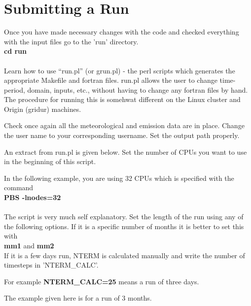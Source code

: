 \chapter{Submitting a Run}

Once you have made necessary changes with the code and checked
everything with the input files go to the 'run' directory. \\

\textbf{cd run} \\
\\


Learn how to use ``run.pl'' (or grun.pl) - the perl scripts which generates
the appropriate Makefile and fortran files. run.pl allows
the user to change time-period, domain, inputs, etc., without
having to change any fortran files by hand. The procedure for running
this is somehwat different on the Linux cluster and  Origin (gridur)
machines.

Check once again all the meteorological and emission data are in place.  Change
the user name to your corresponding username.  Set the output path
properly. 


An extract from run.pl  is given below.  Set the number of CPUs you
want to use in the beginning of this script. 


In the following example, you are using 32 CPUs which is specified
with the command \\

\textbf{PBS -lnodes=32} \\
\\

The script is very much self explanatory.  Set the length of the run
using any of the following options.  If it is a specific number of months it
is better to set this with \\

\textbf{mm1} and \textbf{mm2}\\


If it is a few days run, NTERM is calculated manually and write the
number of timesteps in 'NTERM\_CALC'.  

For example \textbf{NTERM\_CALC=25} means a run of three days. 

 The example given here is for a run of 3 months.  

